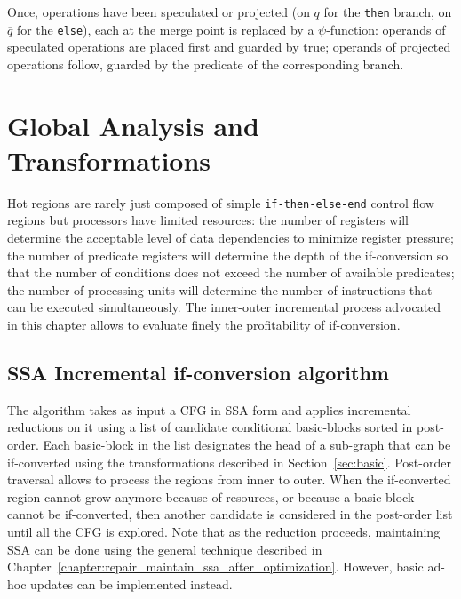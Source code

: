 Once, operations have been speculated or projected (on $q$ for the \texttt{then} branch, on $\overline{q}$ for the \texttt{else}), each \phifuns at the merge point is replaced by a $\psi$-function: operands of speculated operations are placed first and guarded by true; operands of projected operations follow, guarded by the predicate of the corresponding branch.

\section{Global Analysis and Transformations}
\label{sec:if_conversion:hyperblock}
Hot regions are rarely just composed of simple \texttt{if-then-else-end} control flow regions but processors have limited resources: the number of registers will determine the acceptable level of data dependencies to minimize register pressure; the number of predicate registers will determine the depth of the if-conversion so that the number of conditions does not exceed the number of available predicates; the number of processing units will determine the number of instructions that can be executed simultaneously. The inner-outer incremental process advocated in this chapter allows to evaluate finely the profitability of if-conversion. 

\subsection{SSA Incremental if-conversion algorithm}


The algorithm takes as input a CFG in SSA form and applies incremental reductions on it using a list of candidate conditional basic-blocks sorted in post-order. 
Each basic-block in the list designates the head of a sub-graph that can be if-converted using the transformations described in Section~\ref{sec:basic}. Post-order traversal allows to process the regions from inner to outer. When the if-converted region cannot grow anymore because of resources, or because a basic block cannot be if-converted, then another candidate is considered in the post-order list until all the CFG is explored.
%
%
Note that as the reduction proceeds, maintaining SSA can be done using the general technique described in Chapter~\ref{chapter:repair_maintain_ssa_after_optimization}. However, basic ad-hoc updates can be implemented instead. 

